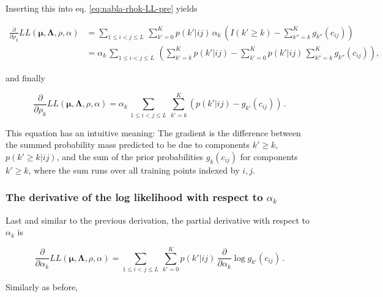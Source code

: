 \documentclass[11pt,a4paper,twoside]{book}
\newcommand{\cij}{c_{ij}}
\theoremstyle{definition}
\theoremstyle{definition}
\theoremstyle{remark}
\begin{document}
Inserting this into eq. \eqref{eq:nabla-rhok-LL-pre} yields

\begin{align}
    \frac{\partial} {\partial \rho_k}  L\!L(\mathbf{\mu}, \mathbf{\Lambda}, \rho, \alpha)  
    &= \sum_{1\le i<j\le L}  \, \sum_{k'=0}^K  p(k'|ij) \, \alpha_k \, \left(  I(k' \ge k)  -  \sum_{k''=k}^K  g_{k''}(\cij) \right)  \nonumber \\
    &= \alpha_k \, \sum_{1\le i<j\le L}  \, \left( \sum_{k'=k}^K  p(k'|ij)   -  \sum _{k'=0}^K  p(k'|ij) \, \sum_{k''=k}^K  g_{k''}(\cij)  \right) ,
\end{align}

and finally

\begin{equation}
    \frac{\partial} {\partial \rho_k}  L\!L(\mathbf{\mu}, \mathbf{\Lambda}, \rho, \alpha)  = \alpha_k \, \sum_{1\le i<j\le L}  \, \sum_{k'=k}^K  ( p(k'|ij) - g_{k'}(\cij) )  \, .
\end{equation}

This equation has an intuitive meaning: The gradient is the difference
between the summed probability mass predicted to be due to components
\(k' \ge k\), \(p(k'\ge k | ij)\), and the sum of the prior
probabilities \(g_k(\cij)\) for components \(k' \ge k\), where the sum
runs over all training points indexed by \(i,j\).

\subsubsection{\texorpdfstring{The derivative of the log likelihood with
respect to
\(\alpha_k\)}{The derivative of the log likelihood with respect to \textbackslash{}alpha\_k}}\label{the-derivative-of-the-log-likelihood-with-respect-to-alpha_k}

Last and similar to the previous derivation, the partial derivative with
respect to \(\alpha_k\) is

\begin{equation}
  \frac{\partial} {\partial \alpha_k} L\!L(\mathbf{\mu}, \mathbf{\Lambda}, \rho, \alpha) = \sum_{1\le i<j\le L}  \, \sum_{k'=0}^K  p(k'|ij) \,  \frac{\partial} {\partial \alpha_k}  \log g_{k'}(\cij)  \,.
    \label{eq:nabla-alphak-LLpre}
\end{equation}

Similarly as before,
\end{document}
